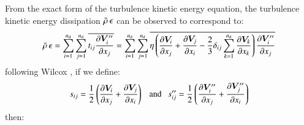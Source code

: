\documentclass{warpdoc}
\newcommand{\nd}{{{n}_{\rm d}}}
\begin{document}
From the exact form of the turbulence kinetic energy equation, the
turbulence kinetic energy dissipation $\bar{\rho}\, \epsilon$ can be observed
to correspond to:
%
\begin{equation}
  \wbar{\rho}\, \epsilon
    = \sum_{i=1}^{\nd} \sum_{j=1}^{\nd}
      \overline{ t_{ij}\frac{\partial \bm{V}_i^{\prime\prime}}{\partial x_j}}
    = \sum_{i=1}^{\nd} \sum_{j=1}^{\nd}
      \overline{
                    \eta  \left( \frac{\partial \bm{V}_i}{\partial x_j}
                     + \frac{\partial \bm{V}_j}{\partial x_i}
                     - \frac{2}{3} \delta_{ij} \sum_{k=1}^{\nd} \frac{\partial \bm{V}_k}{\partial x_k}
                 \right)
                  \frac{\partial \bm{V}_i^{\prime\prime}}{\partial x_j}}
\end{equation}
%
following Wilcox \cite{turb:wilcoxbook}, if we define:
%
\begin{equation}
 s_{ij}=\frac{1}{2}\left( \frac{\partial \bm{V}_i}{\partial x_j} +
                          \frac{\partial \bm{V}_j}{\partial x_i} \right)
 {\rm    ~~~ and~~~    }
 s_{ij}^{\prime\prime}=\frac{1}{2}\left( \frac{\partial \bm{V}_i^{\prime\prime}}{\partial x_j} +
                          \frac{\partial \bm{V}_j^{\prime\prime}}{\partial x_i} \right)
\end{equation}
%
then:
%
\end{document}
